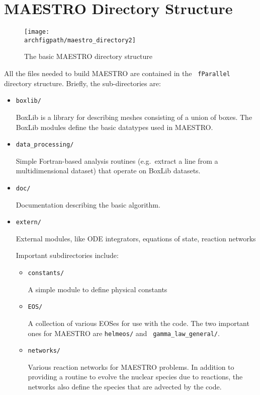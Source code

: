 \section{MAESTRO Directory Structure}

\begin{figure}[h]
\centering
\texttt{[image: \\archfigpath/maestro\_directory2]}
\caption[MAESTRO directory structure]
{The basic MAESTRO directory structure}
\end{figure}

All the files needed to build MAESTRO are contained in the {\tt
fParallel} directory structure.  Briefly, the sub-directories
are:
\begin{itemize}
\item {\tt boxlib/} 

 BoxLib is a library for describing meshes consisting of a union
 of boxes.  The BoxLib modules define the basic datatypes used
 in MAESTRO.

\item {\tt data\_processing/}

 Simple Fortran-based analysis routines (e.g.\ extract a line from a
 multidimensional dataset) that operate on BoxLib datasets.

\item {\tt doc/}

 Documentation describing the basic algorithm.

\item {\tt extern/}

 External modules, like ODE integrators, equations of state, reaction
 networks

 Important subdirectories include:
 \begin{itemize}
 \item {\tt constants/}

 A simple module to define physical constants

 \item {\tt EOS/}

 A collection of various EOSes for use with the code.  The two
 important ones for MAESTRO are {\tt helmeos/} and {\tt
 gamma\_law\_general/}.

 \item {\tt networks/}

 Various reaction networks for MAESTRO problems.  In addition to
 providing a routine to evolve the nuclear species due to reactions,
 the networks also define the species that are advected by the code.


\end{itemize}
\end{itemize}
